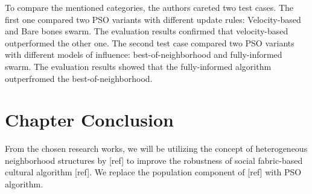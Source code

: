 To compare the mentioned categories, the authors careted two test cases. The first one compared two PSO variants with different update rules: Velocity-based and Bare bones swarm. The evaluation results confirmed that velocity-based outperformed the other one. The second test case compared two PSO variants with different models of influence: best-of-neighborhood and fully-informed swarm. The evaluation results showed that the fully-informed algorithm outperfromed the best-of-neighborhood.

\section{Chapter Conclusion}
From the chosen research works, we will be utilizing the concept of heterogeneous neighborhood structures by [ref] to improve the robustness of social fabric-based cultural algorithm [ref]. We replace the population component of [ref] with PSO algorithm.


